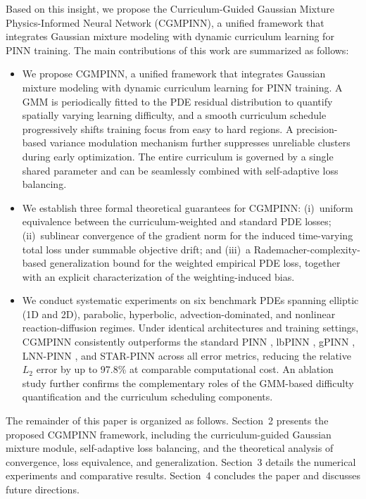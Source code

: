 \documentclass{article}
\theoremstyle{plain}
\theoremstyle{definition}
\theoremstyle{remark}
\begin{document}
	Based on this insight, we propose the Curriculum-Guided Gaussian Mixture Physics-Informed Neural Network (CGMPINN), a unified framework that integrates Gaussian mixture modeling with dynamic curriculum learning for PINN training. The main contributions of this work are summarized as follows:
	\begin{itemize}
		\item We propose CGMPINN, a unified framework that integrates Gaussian mixture modeling with dynamic curriculum learning for PINN training. A GMM is periodically fitted to the PDE residual distribution to quantify spatially varying learning difficulty, and a smooth curriculum schedule progressively shifts training focus from easy to hard regions. A precision-based variance modulation mechanism further suppresses unreliable clusters during early optimization. The entire curriculum is governed by a single shared parameter and can be seamlessly combined with self-adaptive loss balancing.
		\item We establish three formal theoretical guarantees for CGMPINN: (i)~uniform equivalence between the curriculum-weighted and standard PDE losses; (ii)~sublinear convergence of the gradient norm for the induced time-varying total loss under summable objective drift; and (iii)~a Rademacher-complexity-based generalization bound for the weighted empirical PDE loss, together with an explicit characterization of the weighting-induced bias.
		\item We conduct systematic experiments on six benchmark PDEs spanning elliptic (1D and 2D), parabolic, hyperbolic, advection-dominated, and nonlinear reaction-diffusion regimes. Under identical architectures and training settings, CGMPINN consistently outperforms the standard PINN \cite{PINN_Raissi1}, lbPINN \cite{Xiang26}, gPINN \cite{Yu28}, LNN-PINN \cite{Tao29}, and STAR-PINN \cite{Dodge30} across all error metrics, reducing the relative $L_2$ error by up to 97.8\% at comparable computational cost. An ablation study further confirms the complementary roles of the GMM-based difficulty quantification and the curriculum scheduling components.
	\end{itemize}
	
	The remainder of this paper is organized as follows. Section~2 presents the proposed CGMPINN framework, including the curriculum-guided Gaussian mixture module, self-adaptive loss balancing, and the theoretical analysis of convergence, loss equivalence, and generalization. Section~3 details the numerical experiments and comparative results. Section~4 concludes the paper and discusses future directions.
	
\end{document}
